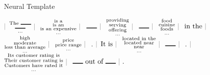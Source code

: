 \begin{frame}{Neural Template}
\air

      \begin{center}

$\textcolor{gray}{|} $ $ \substack{\text{The \rule{15pt}{1pt}}\\\text{\rule{15pt}{1pt}}\\ \dots}
\ \textcolor{gray}{|} \  $ $ \substack{\text{is a}\\\text{is an}\\\text{is an expensive}\\ \dots}
\ \textcolor{gray}{|} \  $ $ \text{\rule{15pt}{1pt}} \ \textcolor{gray}{|} \  $ $ \substack{\text{providing}\\\text{serving}\\\text{offering}\\ \dots}
\ \textcolor{gray}{|} \  $ $ \text{\rule{15pt}{1pt}} \ \textcolor{gray}{|} \  $ $ \substack{\text{food}\\\text{cuisine}\\\text{foods}\\ \dots}
\ \textcolor{gray}{|} \  $ $ \text{in the} \ \textcolor{gray}{|} \  $ $ \substack{\text{high}\\\text{moderate}\\\text{less than average}\\ \dots}
\ \textcolor{gray}{|} \  $ $ \substack{\text{price}\\\text{price range}\\ \dots}
\ \textcolor{gray}{|} \  $ $ \text{.}$ $\textcolor{gray}{|}$ $ \text{It is} \ \textcolor{gray}{|} \  $ $ \substack{\text{located in the}\\\text{located near}\\\text{near}\\ \dots}
\ \textcolor{gray}{|} \  $ $ \text{\rule{15pt}{1pt}} \ \textcolor{gray}{|} \  $ $ \text{.}$ $ \textcolor{gray}{|} \  $ $ \substack{\text{Its customer rating is}\\\text{Their customer rating is}\\\text{Customers have rated it}\\ \dots}
\ \textcolor{gray}{|} \  $ $ \text{\rule{15pt}{1pt} out of \rule{15pt}{1pt}} \ \textcolor{gray}{|} \  .$
    \end{center}
\end{frame}


